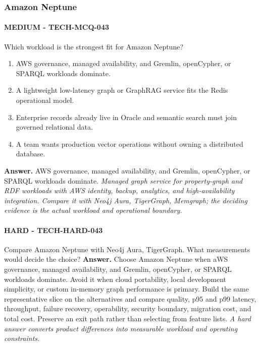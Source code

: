 \subsubsection*{Amazon Neptune}
\paragraph{MEDIUM - TECH-MCQ-043} Which workload is the strongest fit for Amazon Neptune?
\begin{enumerate}[label=\Alph*.]
\item AWS governance, managed availability, and Gremlin, openCypher, or SPARQL workloads dominate.
\item A lightweight low-latency graph or GraphRAG service fits the Redis operational model.
\item Enterprise records already live in Oracle and semantic search must join governed relational data.
\item A team wants production vector operations without owning a distributed database.
\end{enumerate}
\textbf{Answer.} AWS governance, managed availability, and Gremlin, openCypher, or SPARQL workloads dominate.
\textit{Managed graph service for property-graph and RDF workloads with AWS identity, backup, analytics, and high-availability integration. Compare it with Neo4j Aura, TigerGraph, Memgraph; the deciding evidence is the actual workload and operational boundary.}
\paragraph{HARD - TECH-HARD-043} Compare Amazon Neptune with Neo4j Aura, TigerGraph. What measurements would decide the choice?
\textbf{Answer.} Choose Amazon Neptune when aWS governance, managed availability, and Gremlin, openCypher, or SPARQL workloads dominate. Avoid it when cloud portability, local development simplicity, or custom in-memory graph performance is primary. Build the same representative slice on the alternatives and compare quality, p95 and p99 latency, throughput, failure recovery, operability, security boundary, migration cost, and total cost. Preserve an exit path rather than selecting from feature lists.
\textit{A hard answer converts product differences into measurable workload and operating constraints.}
